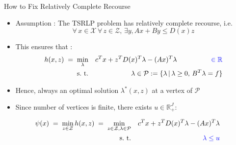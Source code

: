 \documentclass[xcolor=x11names,compress]{beamer}
\renewcommand{\(}{\begin{columns}}
\renewcommand{\)}{\end{columns}}
\newcommand{\<}[1]{\begin{column}{#1}}
\renewcommand{\>}{\end{column}}
\def\subto{{\rm s. \mbox{ }\rm t.}}
\def\min{\mathop{\rm min}}
\newcommand{\0}{\V{0}}
\newcommand{\1}{\V{1}}
\renewcommand{\Re}{\mathbb{R}}
\newcommand{\quoteIt}[1]{``#1''}
\newcommand{\Z}{\mathcal{Z}}
\begin{document}
%


\begin{frame}{How to Fix Relatively Complete Recourse}

\begin{itemize}
\item Assumption : The TSRLP problem has relatively complete recourse, i.e. 
\[\forall\,x\in\mathcal{X}\,\forall\,z\in\mathcal{Z},\, \exists y, Ax + By \leq D(x)z\]
\pause\vspace{-0.5cm}\item This  ensures that :
\begin{eqnarray*}
h(x,z)\;=\;\min_{\lambda} &&c^Tx+ z^TD(x)^T\lambda-(Ax)^T\lambda\;\;\;\;\;\;\;\;\;\;\;\;\;\;\;\;\;\;{\LARGE\color{blue}\in\Re}\\
\subto && \lambda\in\mathcal{P}:=\{ \lambda \,|\, \lambda\geq 0,\, B^T\lambda = f \}
\end{eqnarray*}
\pause\item Hence, always an optimal solution $\lambda^*(x,z)$ at a vertex of $\mathcal{P}$
\pause\item Since  number of vertices is finite, there exists  $u\in\Re_+^J$:%
\end{itemize}
\begin{eqnarray*}
\psi(x) \;=\;\min_{z\in\mathcal{Z}}h(x,z)\;=\;\min_{z\in\Z,\lambda\in \mathcal{P}} &&c^Tx+ z^TD(x)^T\lambda-(Ax)^T\lambda\\
\subto&& {\color{blue}\lambda \leq u}
\end{eqnarray*}
\end{frame}
\end{document}
